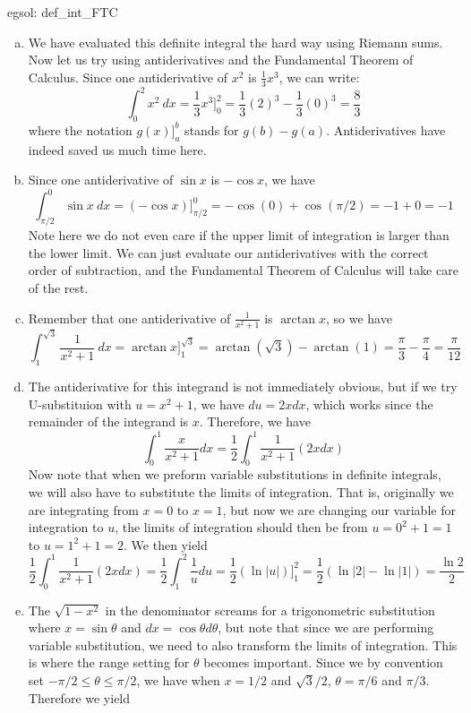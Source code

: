 \begin{egsol}[]{egsol: def_int_FTC}
    \begin{enumerate}[a)]
        \item We have evaluated this definite integral the hard way using Riemann sums.  Now let us try using antiderivatives and the Fundamental Theorem of Calculus.  Since one antiderivative of $x^2$ is $\frac{1}{3}x^3$, we can write:
        \[\int_0^2 x^2~dx = \frac{1}{3}x^3\Big]^2_0 = \frac{1}{3}(2)^3 - \frac{1}{3}(0)^3 = \frac{8}{3}\]
        where the notation $g(x)\big]^b_a$ stands for $g(b)-g(a)$.  Antiderivatives have indeed saved us much time here.
        \item Since one antiderivative of $\sin x$ is $-\cos x$, we have
        \[\int_{\pi/2}^0 \sin x~dx = (-\cos x)\Big]_{\pi/2}^0 = -\cos(0) + \cos(\pi/2) = -1 + 0 = -1\]
        Note here we do not even care if the upper limit of integration is larger than the lower limit.  We can just evaluate our antiderivatives with the correct order of subtraction, and the Fundamental Theorem of Calculus will take care of the rest.
        \item Remember that one antiderivative of $\frac{1}{x^2+1}$ is $\arctan x$, so we have
        \[\int_1^{\sqrt{3}} \frac{1}{x^2+1}~dx = \arctan x\Big]_1^{\sqrt{3}} = \arctan(\sqrt{3}) - \arctan(1) = \frac{\pi}{3} - \frac{\pi}{4} = \frac{\pi}{12}\]
        \item The antiderivative for this integrand is not immediately obvious, but if we try U-substituion with $u = x^2+1$, we have $du = 2xdx$, which works since the remainder of the integrand is $x$.  Therefore, we have
        \[\int_0^1 \frac{x}{x^2+1} dx = \frac{1}{2}\int_0^1 \frac{1}{x^2+1}(2xdx)\]
        Now note that when we preform variable substitutions in definite integrals, we will also have to substitute the limits of integration.  That is, originally we are integrating from $x = 0$ to $x = 1$, but now we are changing our variable for integration to $u$, the limits of integration should then be from $u = 0^2+1 = 1$ to $u = 1^2 + 1 = 2$.  We then yield
        \[\frac{1}{2}\int_0^1 \frac{1}{x^2+1}(2xdx) = \frac{1}{2} \int_1^2 \frac{1}{u} du = \frac{1}{2}(\ln |u|)\Big]_1^2 = \frac{1}{2}(\ln |2| - \ln |1|) = \frac{\ln 2}{2}\]
        \item The $\sqrt{1-x^2}$ in the denominator screams for a trigonometric substitution where $x = \sin \theta$ and $dx = \cos \theta d\theta$, but note that since we are performing variable substitution, we need to also transform the limits of integration.  This is where the range setting for $\theta$ becomes important.  Since we by convention set $-\pi/2 \le \theta \le \pi/2$, we have when $x = 1/2$ and $\sqrt{3}/2$, $\theta = \pi/6$ and $\pi/3$. Therefore we yield

\end{enumerate}
\end{egsol}
